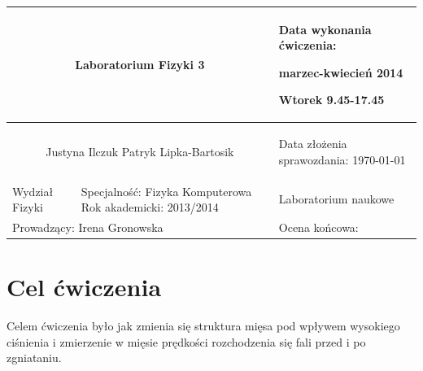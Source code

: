 \documentclass[a4paper,12pt]{article}
\author{Justyna Ilczuk, Patryk Lipka-Bartosik}
\begin{document}
\begin{center}

    \begin{tabular}{ | m{5cm}| m{5cm} | m{5cm} |}
    \hline 
    \multicolumn{2}{|c|}{{ \Large \textbf{Laboratorium Fizyki 3}} }
    &  
    \begin{center}
    Data wykonania ćwiczenia:
    \end{center}
    \begin{center}
      marzec-kwiecień 2014 
    \end{center}
    \begin{center}
    Wtorek 9.45-17.45
    \end{center}
     \\ 
    
    \hline
    \multicolumn{2}{|c|}{Justyna Ilczuk \newline Patryk Lipka-Bartosik}
    & \begin{center}
    {\small Data złożenia sprawozdania:} \newline \today
    \end{center}   \\
   	
   	\hline
    Wydział Fizyki & Specjalność: Fizyka Komputerowa \newline Rok akademicki: 2013/2014 &    Laboratorium naukowe \\
   	\hline
   	\multicolumn{2}{|l|}{Prowadzący: Irena Gronowska} & \multicolumn{1}{|l|}{Ocena końcowa:}\\
    \hline
    \end{tabular}
\end{center}

\newpage

\pagestyle{fancy}
\fancyfoot[CO]{\ }
\fancyhead[RO]{\footnotesize{\thepage} }



\section{Cel ćwiczenia}

Celem ćwiczenia było jak zmienia się struktura mięsa pod wpływem wysokiego ciśnienia i zmierzenie w mięsie prędkości rozchodzenia się fali przed i po zgniataniu. 
\end{document}
